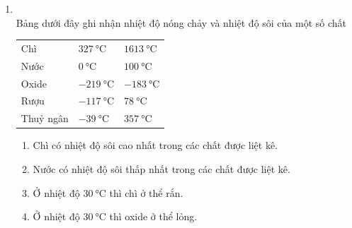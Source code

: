 \begin{enumerate}[label=\bfseries Câu \arabic*:, leftmargin=1.7cm]
\item {}\\
Bảng dưới đây ghi nhận nhiệt độ nóng chảy và nhiệt độ sôi của một số chất
\begin{center}
	\begin{tabular}{|C{8em}|C{10em}|C{8em}|}
		\hline
		&  &\\
		\hline
		Chì & $\SI{327}{\celsius}$ & $\SI{1613}{\celsius}$\\
		\hline
		Nước & $\SI{0}{\celsius}$ & $\SI{100}{\celsius}$\\
		\hline
		Oxide & $\SI{-219}{\celsius}$ & $\SI{-183}{\celsius}$\\
		\hline
		Rượu & $\SI{-117}{\celsius}$ & $\SI{78}{\celsius}$\\
		\hline
		Thuỷ ngân & $\SI{-39}{\celsius}$ & $\SI{357}{\celsius}$\\
		\hline
	\end{tabular}
\end{center}
\begin{enumerate}[label=\alph*)]
	\item Chì có nhiệt độ sôi cao nhất trong các chất được liệt kê.
	\item Nước có nhiệt độ sôi thấp nhất trong các chất được liệt kê.
	\item Ở nhiệt độ $\SI{30}{\celsius}$ thì chì ở thể  rắn.
	\item Ở nhiệt độ $\SI{30}{\celsius}$ thì oxide ở thể lỏng.
\end{enumerate}
	

\end{enumerate}
